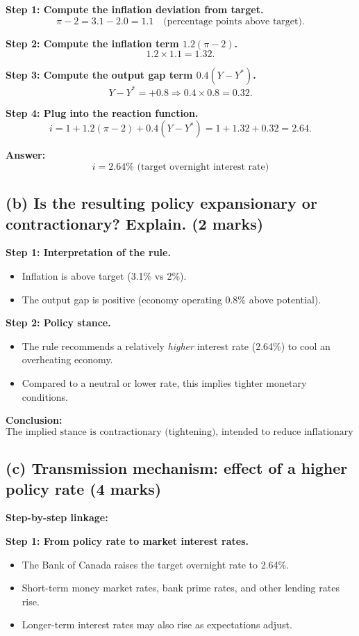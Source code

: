 \documentclass[12pt]{article}
\begin{document}
\textbf{Step 1: Compute the inflation deviation from target.}
\[
\pi - 2 = 3.1 - 2.0 = 1.1 \quad \text{(percentage points above target)}.
\]

\textbf{Step 2: Compute the inflation term \(1.2(\pi - 2)\).}
\[
1.2 \times 1.1 = 1.32.
\]

\textbf{Step 3: Compute the output gap term \(0.4(Y - Y^*)\).}
\[
Y - Y^* = +0.8 \Rightarrow 0.4 \times 0.8 = 0.32.
\]

\textbf{Step 4: Plug into the reaction function.}
\[
i = 1 + 1.2(\pi - 2) + 0.4(Y - Y^*)
= 1 + 1.32 + 0.32 = 2.64.
\]

\textbf{Answer:}
\[
\boxed{i = 2.64\% \text{ (target overnight interest rate)}}
\]

\subsection*{(b) Is the resulting policy expansionary or contractionary? Explain. (2 marks)}

\textbf{Step 1: Interpretation of the rule.}
\begin{itemize}
    \item Inflation is above target (3.1\% vs 2\%).
    \item The output gap is positive (economy operating 0.8\% above potential).
\end{itemize}

\textbf{Step 2: Policy stance.}
\begin{itemize}
    \item The rule recommends a relatively \emph{higher} interest rate (2.64\%) to cool an overheating economy.
    \item Compared to a neutral or lower rate, this implies tighter monetary conditions.
\end{itemize}

\textbf{Conclusion:}
\[
\boxed{\text{The implied stance is contractionary (tightening), intended to reduce inflationary pressure.}}
\]

\subsection*{(c) Transmission mechanism: effect of a higher policy rate (4 marks)}

\textbf{Step-by-step linkage:}

\textbf{Step 1: From policy rate to market interest rates.}
\begin{itemize}
    \item The Bank of Canada raises the target overnight rate to 2.64\%.
    \item Short-term money market rates, bank prime rates, and other lending rates rise.
    \item Longer-term interest rates may also rise as expectations adjust.
\end{itemize}
\end{document}

